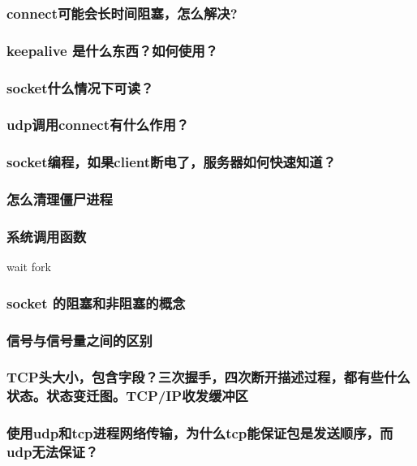 \documentclass[UTF8,a4paper,8pt]{ctexart}
\begin{document}
		\subsubsection{connect可能会长时间阻塞，怎么解决?}
		
		\subsubsection{keepalive 是什么东西？如何使用？}
		
		\subsubsection{socket什么情况下可读？}
		
		\subsubsection{udp调用connect有什么作用？}
		
		\subsubsection{socket编程，如果client断电了，服务器如何快速知道？}
			
		\subsubsection{怎么清理僵尸进程}
		
		\subsubsection{系统调用函数} wait fork
		
		\subsubsection{socket 的阻塞和非阻塞的概念}
		
		\subsubsection{信号与信号量之间的区别}
		
		\subsubsection{TCP头大小，包含字段？三次握手，四次断开描述过程，都有些什么状态。状态变迁图。TCP/IP收发缓冲区}
		
		\subsubsection{使用udp和tcp进程网络传输，为什么tcp能保证包是发送顺序，而 udp无法保证？}
		
\end{document}
